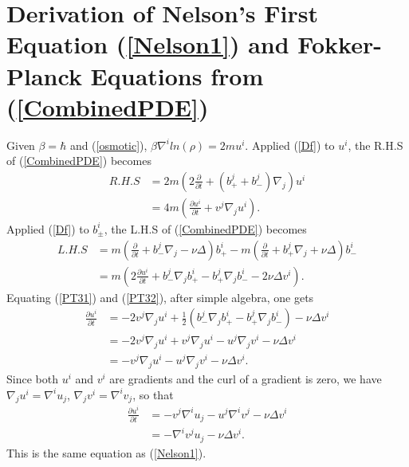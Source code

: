 \documentclass[%
 aip, 
 amsmath,amssymb,amsthm,
 nofootinbib,
 reprint,
]{revtex4-1}
\begin{document}
\section{Derivation of Nelson's First Equation (\ref{Nelson1}) and Fokker-Planck Equations from (\ref{CombinedPDE})}
\label{AppendixD}
Given $\beta=\hbar$ and (\ref{osmotic}), $\beta\nabla^i ln(\rho)=2mu^i$. Applied (\ref{Df}) to $u^i$, the R.H.S of (\ref{CombinedPDE}) becomes
\begin{equation}
    \label{PT31}
    \begin{split}
    R.H.S &= 2m(2\frac{\partial}{\partial t} + (b_+^j+b_-^j)\nabla_j)u^i \\
    &= 4m(\frac{\partial u^i}{\partial t} + v^j\nabla_ju^i).
    \end{split}
\end{equation}
Applied (\ref{Df}) to $b^i_{\pm}$, the L.H.S of (\ref{CombinedPDE}) becomes
\begin{equation}
    \label{PT32}
    \begin{split}
    L.H.S &= m(\frac{\partial}{\partial t} + b_-^j\nabla_j - \nu\Delta)b_+^i -m(\frac{\partial}{\partial t} + b_+^j\nabla_j + \nu\Delta)b_-^i \\
    &= m(2\frac{\partial u^i}{\partial t} + b_-^j\nabla_jb_+^i-b_+^j\nabla_jb_-^i-2\nu\Delta v^i).
    \end{split}
\end{equation}
Equating (\ref{PT31}) and (\ref{PT32}), after simple algebra, one gets
\begin{equation}
    \label{PT33}
    \begin{split}
    \frac{\partial u^i}{\partial t} &= -2v^j\nabla_ju^i + \frac{1}{2}(b_-^j\nabla_jb_+^i-b_+^j\nabla_jb_-^i)-\nu\Delta v^i \\
    & = -2v^j\nabla_ju^i + v^j\nabla_ju^i- u^j\nabla_jv^i -\nu\Delta v^i \\
    & = - v^j\nabla_ju^i - u^j\nabla_jv^i - \nu\Delta v^i.
 \end{split}
\end{equation}
Since both $u^i$ and $v^i$ are gradients and the curl of a gradient is zero, we have $\nabla_ju^i = \nabla^i u_j$, $\nabla_jv^i = \nabla^i v_j$, so that
\begin{equation}
    \label{PT33}
    \begin{split}
    \frac{\partial u^i}{\partial t} &= - v^j\nabla^iu_j - u^j\nabla^i v^j - \nu\Delta v^i \\
    &= - \nabla^i v^ju_j - \nu\Delta v^i.
    \end{split}
\end{equation}
This is the same equation as (\ref{Nelson1}). 
\end{document}
